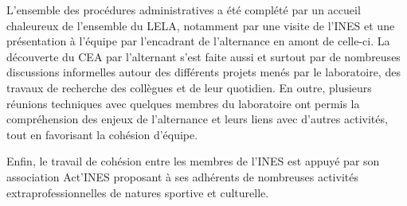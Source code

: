     L'ensemble des procédures administratives a été complété par un accueil chaleureux de l'ensemble du \gls{LELA}, notamment par une visite
de l'\gls{INES} et une présentation à l'équipe par l'encadrant de l'alternance en amont de celle-ci.
La découverte du \gls{CEA} par l'alternant s'est faite aussi et surtout par de nombreuses discussions informelles autour des différents projets menés par le laboratoire, des travaux de recherche des collègues et de leur quotidien.
En outre, plusieurs réunions techniques avec quelques membres du laboratoire ont permis la compréhension des enjeux de l'alternance et leurs liens avec d'autres activités, tout en favorisant la cohésion d'équipe.

Enfin, le travail de cohésion entre les membres de l'\gls{INES} est appuyé par son association Act'\gls{INES} proposant à ses adhérents de nombreuses activités extraprofessionnelles de natures sportive et culturelle.
